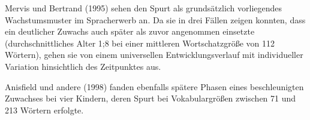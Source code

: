 \documentclass[
  letterpaper,
]{scrbook}
\begin{document}
\begin{tcolorbox}[enhanced jigsaw, breakable, colframe=quarto-callout-note-color-frame, bottomrule=.15mm, left=2mm, opacityback=0, colback=white, rightrule=.15mm, toprule=.15mm, leftrule=.75mm, arc=.35mm]
\begin{minipage}[t]{5.5mm}
\textcolor{quarto-callout-note-color}{\faInfo}
\end{minipage}%
\begin{minipage}[t]{\textwidth - 5.5mm}

Mervis und Bertrand (1995) sehen den Spurt als grundsätzlich
vorliegendes Wachstumsmuster im Spracherwerb an. Da sie in drei Fällen
zeigen konnten, dass ein deutlicher Zuwachs auch später als zuvor
angenommen einsetzte (durchschnittliches Alter 1;8 bei einer mittleren
Wortschatzgröße von 112 Wörtern), gehen sie von einem universellen
Entwicklungsverlauf mit individueller Variation hinsichtlich des
Zeitpunktes aus.

\end{minipage}%
\end{tcolorbox}

\begin{tcolorbox}[enhanced jigsaw, breakable, colframe=quarto-callout-note-color-frame, bottomrule=.15mm, left=2mm, opacityback=0, colback=white, rightrule=.15mm, toprule=.15mm, leftrule=.75mm, arc=.35mm]
\begin{minipage}[t]{5.5mm}
\textcolor{quarto-callout-note-color}{\faInfo}
\end{minipage}%
\begin{minipage}[t]{\textwidth - 5.5mm}

Anisfield und andere (1998) fanden ebenfalls spätere Phasen eines
beschleunigten Zuwachses bei vier Kindern, deren Spurt bei
Vokabulargrößen zwischen 71 und 213 Wörtern erfolgte.

\end{minipage}%
\end{tcolorbox}
\end{document}
